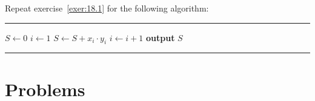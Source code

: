 \begin{exer}
 Repeat exercise~\ref{exer:18.1} for the following algorithm:
\begin{algrthm}
  \hrule\kern5pt\relax
  \begin{algorithmic}[1]
    \State $S \gets 0$
    \State $i \gets 1$
      \State $S \gets S+x_i\cdot y_i$
      \State $i \gets i+1$
    \EndWhile
    \State \textbf{output} $S$
  \end{algorithmic}
  \hrule\kern5pt\relax
\end{algrthm}

%
%
%
%
%
%

% 
% 

\end{exer}

\clearpage

\section{Problems}

